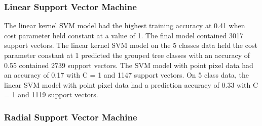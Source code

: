 \documentclass[12pt,twoside]{reedthesis}
\begin{document}
\hypertarget{linear-support-vector-machine}{%
\subsubsection{Linear Support Vector Machine}\label{linear-support-vector-machine}}

The linear kernel SVM model had the highest training accuracy at 0.41 when cost parameter held constant at a value of 1. The final model contained 3017 support vectors. The linear kernel SVM model on the 5 classes data held the cost parameter constant at 1 predicted the grouped tree classes with an accuracy of 0.55 contained 2739 support vectors. The SVM model with point pixel data had an accuracy of 0.17 with C = 1 and 1147 support vectors. On 5 class data, the linear SVM model with point pixel data had a prediction accuracy of 0.33 with C = 1 and 1119 support vectors.

\hypertarget{radial-support-vector-machine}{%
\subsubsection{Radial Support Vector Machine}\label{radial-support-vector-machine}}
\end{document}
